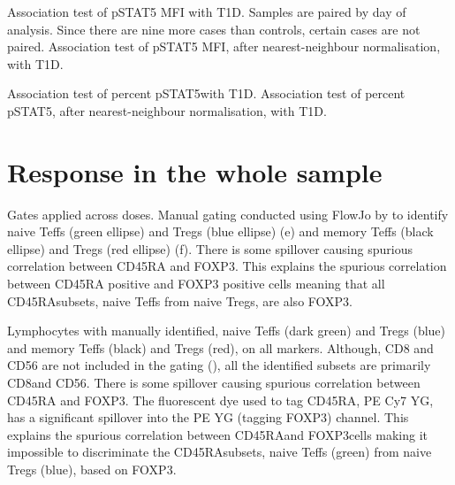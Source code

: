 
{ Association test of pSTAT5 MFI with T1D. }
{
  Samples are paired by day of analysis.
  Since there are nine more cases than controls, certain cases are not paired.
}
{ Association test of pSTAT5 MFI, after nearest-neighbour normalisation, with T1D. }
{ }
{ }

{ Association test of percent pSTAT5\positive with T1D. }
{ }
{ Association test of percent pSTAT5\positive, after nearest-neighbour normalisation, with T1D. }
{ } 


\section{Response in the whole sample}

{ Gates applied across doses. }
{
Manual gating conducted using FlowJo by  to identify
naive Teffs (green ellipse) and Tregs (blue ellipse) (e)
and memory Teffs (black ellipse) and Tregs (red ellipse) (f).
There is some spillover causing spurious correlation between CD45RA and FOXP3.
This explains the spurious correlation between CD45RA positive and FOXP3 positive cells meaning that all CD45RA\positive subsets, naive Teffs from naive Tregs, are also FOXP3\positive.
}

{ Lymphocytes with manually identified, naive Teffs (dark green) and Tregs (blue) and memory Teffs (black) and Tregs (red), on all markers.  }
{
    Although, CD8 and CD56 are not included in the gating (), all the identified subsets are primarily CD8\negative and CD56\negative.
    There is some spillover causing spurious correlation between CD45RA and FOXP3.
    The fluorescent dye used to tag CD45RA, PE Cy7 YG, has a significant spillover into the PE YG (tagging FOXP3) channel.
    This explains the spurious correlation between CD45RA\positive and FOXP3\positive cells making it impossible to discriminate
    the CD45RA\positive subsets, naive Teffs (green) from naive Tregs (blue), based on FOXP3.  
}

